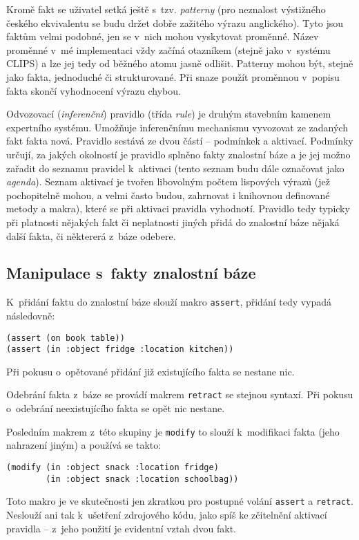 Kromě fakt se uživatel setká ještě s~tzv. \emph{patterny} (pro neznalost
výstižného českého ekvivalentu se budu držet dobře zažitého výrazu anglického).
Tyto jsou faktům velmi podobné, jen se v~nich mohou vyskytovat proměnné.
Název proměnné v~mé implementaci vždy začíná otazníkem (stejně jako v~systému
\textsf{CLIPS}) a lze jej tedy od běžného atomu jasně odlišit. Patterny mohou být, stejně
jako fakta, jednoduché či strukturované. Při snaze použít proměnnou v~popisu
fakta skončí vyhodnocení výrazu chybou.

Odvozovací (\emph{inferenční}) pravidlo (třída \emph{rule}) je druhým stavebním kamenem expertního systému. Umožňuje
inferenčnímu mechanismu vyvozovat ze zadaných fakt fakta nová. Pravidlo sestává
ze dvou částí -- podmínkek a aktivací. Podmínky určují, za jakých okolností je 
pravidlo splněno fakty znalostní báze a je jej možno zařadit do seznamu pravidel
k~aktivaci (tento seznam budu dále označovat jako \emph{agenda}). Seznam
aktivací je tvořen libovolným počtem lispových výrazů (jež pochopitelně mohou,
a velmi často budou, zahrnovat i knihovnou definované metody a makra), které se
při aktivaci pravidla vyhodnotí. Pravidlo tedy typicky při platnosti nějakých
fakt či neplatnosti jiných přidá do znalostní báze nějaká další fakta, či
některerá z~báze odebere.
\subsection{Manipulace s~fakty znalostní báze}
K~přidání faktu do znalostní báze slouží makro \verb|assert|, přidání tedy
vypadá následovně:
\begin{verbatim}
(assert (on book table))
(assert (in :object fridge :location kitchen))
\end{verbatim}
Při pokusu o~opětované přidání již existujícího fakta se nestane nic.

Odebrání fakta z~báze se provádí makrem \verb|retract| se stejnou syntaxí.
Při pokusu o~odebrání neexistujícího fakta se opět nic nestane.

Posledním makrem z~této skupiny je \verb|modify| to slouží k~modifikaci
fakta (jeho nahrazení jiným) a používá se takto:
\begin{verbatim}
(modify (in :object snack :location fridge)
        (in :object snack :location schoolbag))
\end{verbatim}
Toto makro je ve skutečnosti jen zkratkou pro postupné volání \verb|assert|
a \verb|retract|. Neslouží ani tak k~ušetření zdrojového kódu, jako spíš
ke zčitelnění aktivací pravidla -- z~jeho použití je evidentní vztah dvou
fakt.

